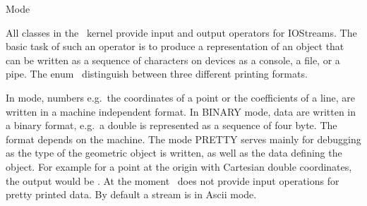 

\begin{ccRefEnum}{Mode}  %


\ccDefinition
  
All classes in the \cgal\ kernel provide input and output operators for
IOStreams.  The basic task of such an operator is to produce a
representation of an object that can be written as a sequence of
characters on devices as a console, a file, or a pipe. The enum \ccRefName\
distinguish between three different printing formats.

In   mode, numbers 
e.g.\ the coordinates of a point or
the coefficients of a line, are written
in a machine independent format. 
In {\sc BINARY} mode, data are written
in a binary format, e.g.\ a double is represented
as a sequence of four byte. The format depends on the machine.
 The mode  {\sc PRETTY}
serves mainly for debugging as the type of the geometric
object is written, as well as the data defining the object. For example
for a point at the origin with Cartesian double coordinates, the output
would be \ccc{PointC2(0.0, 0.0)}.  At the moment \cgal\ does not
provide input operations for pretty printed data. By default a stream
is in {\sc Ascii} mode.





\ccSeeAlso
{} \\
 \\
  \\
  \\
 \\
 \\
 \\
 \\



\end{ccRefEnum}
